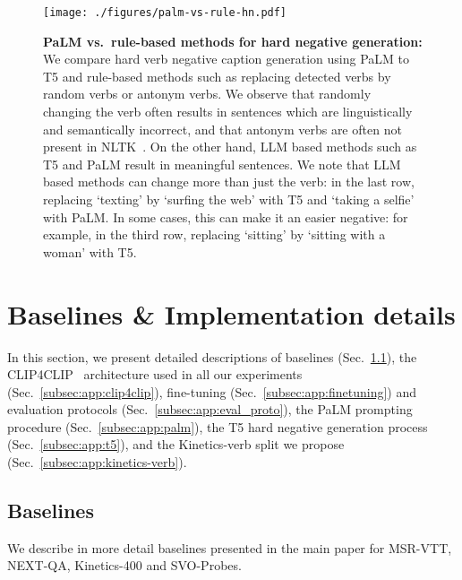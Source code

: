 \begin{figure}[t!]

    \centering
    \texttt{[image: ./figures/palm-vs-rule-hn.pdf]}
    \caption{\textbf{PaLM vs.~rule-based methods for hard negative generation:} We compare hard verb negative caption generation using PaLM to T5 and rule-based methods such as replacing detected verbs by random verbs or antonym verbs.  We observe that randomly changing the verb often results in sentences which are linguistically and semantically incorrect, and that antonym verbs are often not present in NLTK~\cite{bird2009natural}. On the other hand, LLM based methods such as T5 and PaLM result in meaningful sentences. We note that LLM based methods can change more than just the verb: in the last row, replacing `texting' by `surfing the web' with T5 and `taking a selfie' with PaLM. In some cases, this can make it an easier negative: for example, in the third row, replacing `sitting' by `sitting with a woman' with T5.}
    \label{fig:palm-vs-rule-hn}
\end{figure} 

\section{Baselines \& Implementation details}\label{sec:app:details}

In this section, we present detailed descriptions of baselines (Sec.~\ref{subsec:app:baseline}), the CLIP4CLIP~\cite{Luo2021CLIP4Clip} architecture used in all our experiments (Sec.~\ref{subsec:app:clip4clip}), fine-tuning (Sec.~\ref{subsec:app:finetuning}) and evaluation protocols (Sec.~\ref{subsec:app:eval_proto}), the PaLM prompting procedure (Sec.~\ref{subsec:app:palm}), the T5 hard negative generation process (Sec.~\ref{subsec:app:t5}), and the Kinetics-verb split we propose (Sec.~\ref{subsec:app:kinetics-verb}). 

\subsection{Baselines}\label{subsec:app:baseline}

We describe in more detail baselines presented in the main paper for MSR-VTT, NEXT-QA, Kinetics-400 and SVO-Probes.

\clearpage

